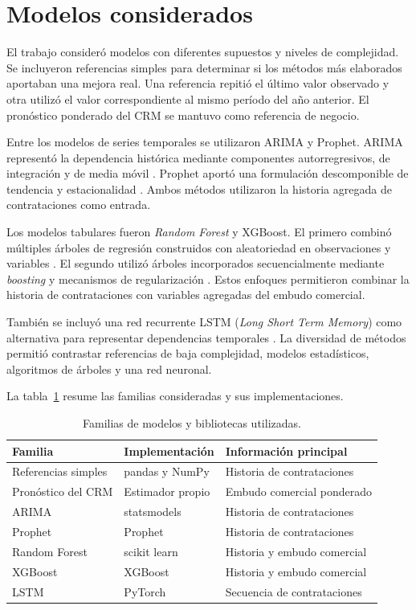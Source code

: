\section{Modelos considerados}
\label{sec:modelosConsiderados}

El trabajo consideró modelos con diferentes supuestos y niveles de complejidad. Se incluyeron referencias simples para determinar si los métodos más elaborados aportaban una mejora real. Una referencia repitió el último valor observado y otra utilizó el valor correspondiente al mismo período del año anterior. El pronóstico ponderado del CRM se mantuvo como referencia de negocio.

Entre los modelos de series temporales se utilizaron ARIMA y Prophet. ARIMA representó la dependencia histórica mediante componentes autorregresivos, de integración y de media móvil \citep{BoxJenkins2015}. Prophet aportó una formulación descomponible de tendencia y estacionalidad \citep{TaylorLetham2018}. Ambos métodos utilizaron la historia agregada de contrataciones como entrada.

Los modelos tabulares fueron \textit{Random Forest} y XGBoost. El primero combinó múltiples árboles de regresión construidos con aleatoriedad en observaciones y variables \citep{Breiman2001}. El segundo utilizó árboles incorporados secuencialmente mediante \textit{boosting} y mecanismos de regularización \citep{ChenGuestrin2016}. Estos enfoques permitieron combinar la historia de contrataciones con variables agregadas del embudo comercial.

También se incluyó una red recurrente LSTM (\textit{Long Short Term Memory}) como alternativa para representar dependencias temporales \citep{HochreiterSchmidhuber1997}. La diversidad de métodos permitió contrastar referencias de baja complejidad, modelos estadísticos, algoritmos de árboles y una red neuronal.

La tabla~\ref{tab:modelosBibliotecas} resume las familias consideradas y sus implementaciones.

\begin{table}[ht]
    \centering
    \caption{Familias de modelos y bibliotecas utilizadas.}
    \label{tab:modelosBibliotecas}
    \small
    \begin{tabular}{p{3.4cm} p{3.9cm} p{4.9cm}}
        \toprule
        Familia & Implementación & Información principal \\
        \midrule
        Referencias simples & pandas y NumPy & Historia de contrataciones \\
        Pronóstico del CRM & Estimador propio & Embudo comercial ponderado \\
        ARIMA & statsmodels & Historia de contrataciones \\
        Prophet & Prophet & Historia de contrataciones \\
        Random Forest & scikit learn & Historia y embudo comercial \\
        XGBoost & XGBoost & Historia y embudo comercial \\
        LSTM & PyTorch & Secuencia de contrataciones \\
        \bottomrule
    \end{tabular}
\end{table}

